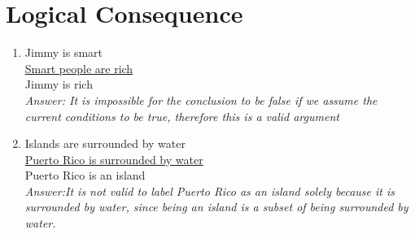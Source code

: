 \documentclass{article}
\begin{document}
\section*{Logical Consequence}
\begin{enumerate}
\item Jimmy is smart\\
\underline{Smart people are rich}\\
Jimmy is rich\\

\emph{Answer: It is impossible for the conclusion to be false if we assume the current conditions to be true, therefore this is a valid argument}

\item Islands are surrounded by water \\
\underline{Puerto Rico is surrounded by water}\\
Puerto Rico is an island\\

\emph{Answer:It is not valid to label Puerto Rico as an island solely because it is surrounded by water, since being an island is a subset of being surrounded by water.}
\end{enumerate}
\end{document}
